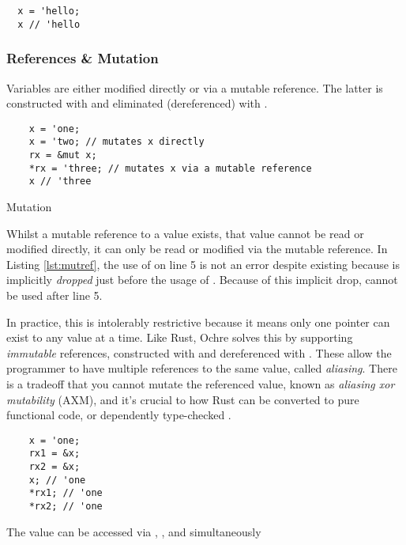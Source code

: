 \documentclass[12pt,twoside]{report}
\begin{document}
\begin{verbatim}
  x = 'hello;
  x // 'hello
\end{verbatim}

\subsubsection{References \& Mutation}
Variables are either modified directly or via a mutable reference. The latter is constructed with  and eliminated (dereferenced) with \mono{*}.

\begin{listing}[H]
  \begin{verbatim}
    x = 'one;
    x = 'two; // mutates x directly
    rx = &mut x;
    *rx = 'three; // mutates x via a mutable reference
    x // 'three
  \end{verbatim}
  \caption{Mutation}
  \label{lst:mutref}
\end{listing}

Whilst a mutable reference to a value exists, that value cannot be read or modified directly, it can only be read or modified via the mutable reference. In Listing \ref{lst:mutref}, the use of  on line 5 is not an error despite  existing because is implicitly \textit{dropped} just before the usage of . Because of this implicit drop,  cannot be used after line 5.

In practice, this is intolerably restrictive because it means only one pointer can exist to any value at a time. Like Rust, Ochre solves this by supporting \textit{immutable} references, constructed with \mono{\&} and dereferenced with \mono{*}. These allow the programmer to have multiple references to the same value, called \textit{aliasing}. There is a tradeoff that you cannot mutate the referenced value, known as \textit{aliasing xor mutability} (AXM), and it's crucial to how Rust can be converted to pure functional code, or dependently type-checked \citep{aeneas,ullrichKhaElectrolysis2024}.

\begin{listing}[H]
  \begin{verbatim}
    x = 'one;
    rx1 = &x;
    rx2 = &x;
    x; // 'one
    *rx1; // 'one
    *rx2; // 'one
  \end{verbatim}
  \caption{The value  can be accessed via , , and  simultaneously}
  \label{lst:immref}
\end{listing}
\end{document}
